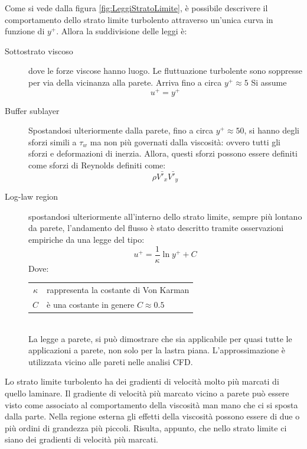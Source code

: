 Come si vede dalla figura \ref{fig:LeggiStratoLimite}, è possibile descrivere il comportamento dello strato limite turbolento attraverso un'unica curva in funzione di $y^+$.
Allora la suddivisione delle leggi è:
\begin{description}
\item[Sottostrato viscoso] dove le forze viscose hanno luogo. Le fluttuazione turbolente sono soppresse per via della vicinanza alla parete. Arriva fino a circa $y^+ \approx 5$
Si assume 
\begin{equation}
u^+ = y^+
\end{equation}
\item[Buffer sublayer]
Spostandosi ulteriormente dalla parete, fino a circa $y^+ \approx 50$, si hanno degli sforzi simili a $\tau_w$ ma non più governati dalla viscosità: ovvero tutti gli sforzi e deformazioni di inerzia. 
Allora, questi sforzi possono essere definiti come sforzi di Reynolds definiti come:
\begin{equation}
\rho \bar{V'_x} \bar{V'_y}
\end{equation}
\item[Log-law region] spostandosi ulteriormente all'interno dello strato limite, sempre più lontano da parete, l'andamento del flusso è stato descritto tramite osservazioni empiriche da una legge del tipo:
\begin{equation}
u^+ = \frac{1}{\kappa}\ln y^+ + C
\end{equation}
Dove:\\
\begin{tabular}{cl}
$\kappa$ & rappresenta la costante di Von Karman\\
$C$ & è una costante in genere $C\approx 0.5$
\end{tabular}\\
La legge a parete, si può dimostrare che sia applicabile per quasi tutte le applicazioni a parete, non solo per la lastra piana. L'approssimazione  è utilizzata vicino alle pareti nelle analisi \ac{CFD}.
\end{description}
Lo strato limite turbolento ha dei gradienti di velocità molto più marcati di quello laminare. Il gradiente di velocità più marcato vicino a parete può essere visto come associato al comportamento della viscosità man mano che ci si sposta dalla parte.
Nella regione esterna gli effetti della viscosità possono essere di due o più ordini di grandezza più piccoli. Risulta, appunto, che nello strato limite ci siano dei gradienti di velocità più marcati.

